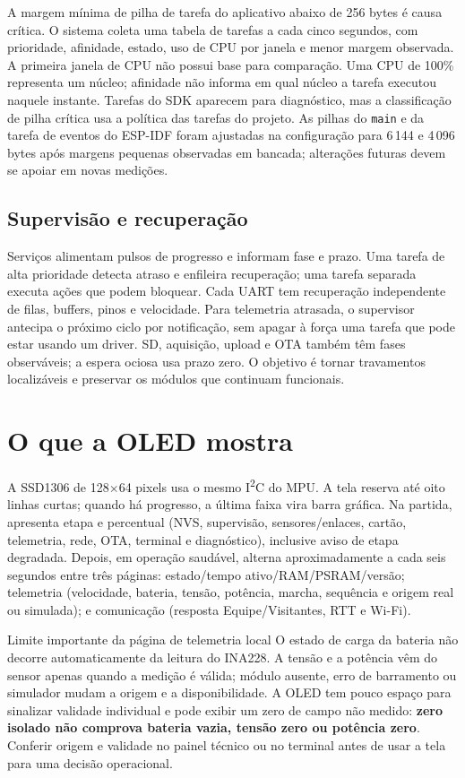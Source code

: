 A margem mínima de pilha de tarefa do aplicativo abaixo de 256 bytes é causa crítica. O sistema coleta uma tabela de tarefas a cada cinco segundos, com prioridade, afinidade, estado, uso de CPU por janela e menor margem observada. A primeira janela de CPU não possui base para comparação. Uma CPU de 100\% representa um núcleo; afinidade não informa em qual núcleo a tarefa executou naquele instante. Tarefas do SDK aparecem para diagnóstico, mas a classificação de pilha crítica usa a política das tarefas do projeto. As pilhas do \texttt{main} e da tarefa de eventos do ESP-IDF foram ajustadas na configuração para 6\,144 e 4\,096 bytes após margens pequenas observadas em bancada; alterações futuras devem se apoiar em novas medições.

\subsection{Supervisão e recuperação}
Serviços alimentam pulsos de progresso e informam fase e prazo. Uma tarefa de alta prioridade detecta atraso e enfileira recuperação; uma tarefa separada executa ações que podem bloquear. Cada UART tem recuperação independente de filas, buffers, pinos e velocidade. Para telemetria atrasada, o supervisor antecipa o próximo ciclo por notificação, sem apagar à força uma tarefa que pode estar usando um driver. SD, aquisição, upload e OTA também têm fases observáveis; a espera ociosa usa prazo zero. O objetivo é tornar travamentos localizáveis e preservar os módulos que continuam funcionais.

\section{O que a OLED mostra}
A SSD1306 de 128$\times$64 pixels usa o mesmo I\textsuperscript{2}C do MPU. A tela reserva até oito linhas curtas; quando há progresso, a última faixa vira barra gráfica. Na partida, apresenta etapa e percentual (NVS, supervisão, sensores/enlaces, cartão, telemetria, rede, OTA, terminal e diagnóstico), inclusive aviso de etapa degradada. Depois, em operação saudável, alterna aproximadamente a cada seis segundos entre três páginas: estado/tempo ativo/RAM/PSRAM/versão; telemetria (velocidade, bateria, tensão, potência, marcha, sequência e origem real ou simulada); e comunicação (resposta Equipe/Visitantes, RTT e Wi-Fi).

\begin{nota}{Limite importante da página de telemetria local}
O estado de carga da bateria não decorre automaticamente da leitura do INA228. A tensão e a potência vêm do sensor apenas quando a medição é válida; módulo ausente, erro de barramento ou simulador mudam a origem e a disponibilidade. A OLED tem pouco espaço para sinalizar validade individual e pode exibir um zero de campo não medido: \textbf{zero isolado não comprova bateria vazia, tensão zero ou potência zero}. Conferir origem e validade no painel técnico ou no terminal antes de usar a tela para uma decisão operacional.
\end{nota}

